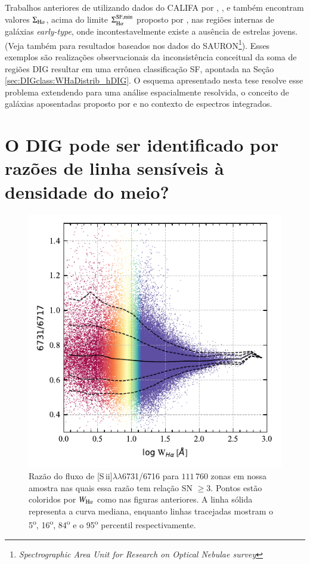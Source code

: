 Trabalhos anteriores de utilizando dados do CALIFA por \citet{Kehrig.etal.2012}, \citet{Singh.etal.2013}, e \citet{Gomes.etal.2016b} também encontram valores $\Sigma_{\Ha}$, acima do limite $\Sigma^{\rm SF,min}_{\Ha}$ proposto por \citet{Zhang.etal.2017a}, nas regiões internas de galáxias {\em early-type}, onde incontestavelmente existe a ausência de estrelas jovens. (Veja também \citealt{Sarzi.etal.2010} para resultados baseados nos dados do SAURON\footnote{\em Spectrographic Area Unit for Research on Optical Nebulae survey}). Esses exemplos são realizações observacionais da inconsistência conceitual da soma de regiões DIG resultar em uma errônea classificação SF, apontada na Seção \ref{sec:DIGclass:WHaDistrib_hDIG}. O esquema apresentado nesta tese resolve esse problema extendendo para uma análise espacialmente resolvida, o conceito de galáxias aposentadas proposto por \citet{Stasinska.etal.2008a} e \citet{CidFernandes.etal.2011a} no contexto de espectros integrados.


\section{O DIG pode ser identificado por razões de linha sensíveis à densidade do meio?}
\label{sec:DIGdisc:nSii}

\begin{figure}
 \includegraphics{figuras/fig_SII_logWHa_SNR3.pdf}
 \caption[$\log$ \sii$\times \log W_{{\rm H}\alpha}$]
 {Razão do fluxo de [S\,{\sc ii}]$\lambda\lambda$6731/6716 para $111\,760$ zonas em nossa amostra nas quais essa razão tem relação SN $\ge 3$. Pontos estão coloridos por $W_{\Ha}$ como nas figuras anteriores. A linha sólida representa a curva mediana, enquanto linhas tracejadas mostram o 5\textsuperscript{o}, 16\textsuperscript{o}, 84\textsuperscript{o} e o 95\textsuperscript{o} percentil respectivamente.}
 \label{fig:S2_WHa}
\end{figure}

